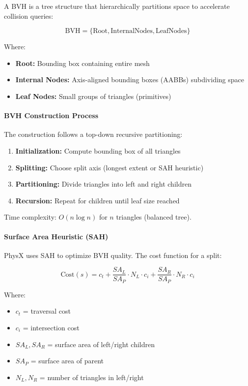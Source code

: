 A BVH is a tree structure that hierarchically partitions space to accelerate collision queries:

\begin{equation}
\text{BVH} = \{\text{Root}, \text{InternalNodes}, \text{LeafNodes}\}
\end{equation}

Where:
\begin{itemize}
    \item \textbf{Root:} Bounding box containing entire mesh
    \item \textbf{Internal Nodes:} Axis-aligned bounding boxes (AABBs) subdividing space
    \item \textbf{Leaf Nodes:} Small groups of triangles (primitives)
\end{itemize}

\paragraph{BVH Construction Process}

The construction follows a top-down recursive partitioning:

\begin{enumerate}
    \item \textbf{Initialization:} Compute bounding box of all triangles
    \item \textbf{Splitting:} Choose split axis (longest extent or SAH heuristic)
    \item \textbf{Partitioning:} Divide triangles into left and right children
    \item \textbf{Recursion:} Repeat for children until leaf size reached
\end{enumerate}

Time complexity: $O(n \log n)$ for $n$ triangles (balanced tree).

\paragraph{Surface Area Heuristic (SAH)}

PhysX uses SAH to optimize BVH quality. The cost function for a split:

\begin{equation}
\text{Cost}(s) = c_t + \frac{SA_L}{SA_P} \cdot N_L \cdot c_i + \frac{SA_R}{SA_P} \cdot N_R \cdot c_i
\end{equation}

Where:
\begin{itemize}
    \item $c_t$ = traversal cost
    \item $c_i$ = intersection cost
    \item $SA_L, SA_R$ = surface area of left/right children
    \item $SA_P$ = surface area of parent
    \item $N_L, N_R$ = number of triangles in left/right
\end{itemize}

